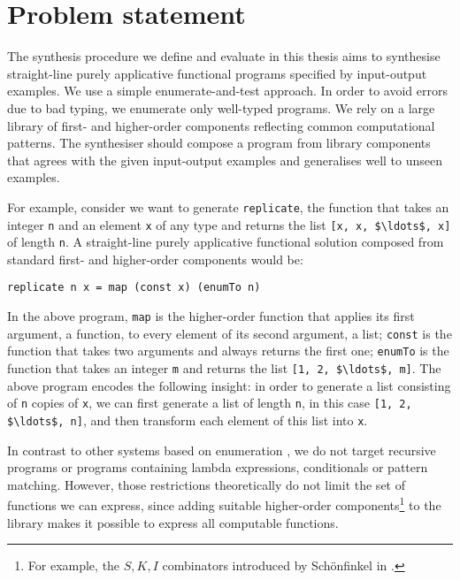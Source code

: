 \section{Problem statement}\label{Problem}

The synthesis procedure we define and evaluate in this thesis aims to synthesise straight-line purely applicative functional programs specified by input-output examples. We use a simple enumerate-and-test approach. In order to avoid errors due to bad typing, we enumerate only well-typed programs. We rely on a large library of first- and higher-order components reflecting common computational patterns.
The synthesiser should compose a program from library components that agrees with the given input-output examples and generalises well to unseen examples.

For example, consider we want to generate \lstinline!replicate!, the function that takes an integer \lstinline!n! and an element \lstinline!x! of any type and returns the list \lstinline![x, x, $\ldots$, x]! of length \lstinline!n!. A straight-line purely applicative functional solution composed from standard first- and higher-order components would be:
\begin{lstlisting}[style=plain]
replicate n x = map (const x) (enumTo n)
\end{lstlisting}
In the above program, \lstinline!map! is the higher-order function that applies its first argument, a function, to every element of its second argument, a list; \lstinline!const! is the function that takes two arguments and always returns the first one; \lstinline!enumTo! is the function that takes an integer \lstinline!m! and returns the list \lstinline![1, 2, $\ldots$, m]!.
The above program encodes the following insight: in order to generate a list consisting of \lstinline!n! copies of \lstinline!x!, we can first generate a list of length \lstinline!n!, in this case \lstinline![1, 2, $\ldots$, n]!, and then transform each element of this list into \lstinline!x!.

In contrast to other systems based on enumeration \cite{MythPaper, LambdaSquarePaper}, we do not target recursive programs or programs containing lambda expressions, conditionals or pattern matching. However, those restrictions theoretically do not limit the set of functions we can express, since adding suitable higher-order components\footnote{For example, the $S, K, I$ combinators introduced by Schönfinkel in \cite{Schonfinkel1924}.} to the library makes it possible to express all computable functions.

